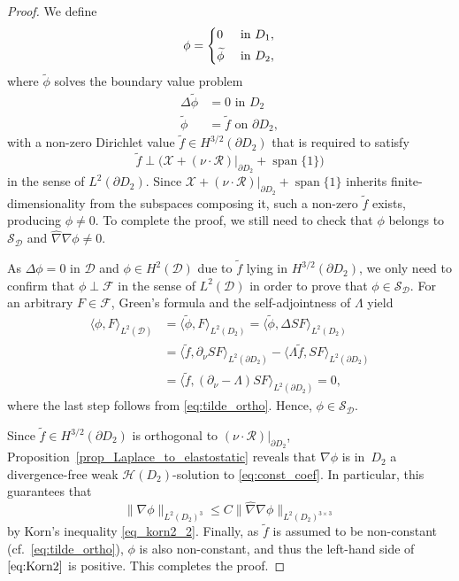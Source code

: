 \documentclass[reqno]{amsart}
\numberwithin{equation}{section}
\numberwithin{figure}{section}
\numberwithin{table}{section}
\newcommand{\norm}[1]{\lVert#1\rVert}
\newcommand{\inner}[1]{\langle#1\rangle}
\newcommand{\D}{\mathcal{D}}
\newcommand\Span{\operatorname{span}}
\theoremstyle{definition}
\theoremstyle{plain}
\theoremstyle{definition}
\theoremstyle{remark}
\numberwithin{equation}{section}
\begin{document}
\begin{proof}
	We define 
	\begin{equation*}
		\phi = 
		\begin{dcases}
		0 &\text{ in } D_1, \\
		\widetilde{\phi} &\text{ in } D_2,
		\end{dcases}
	\end{equation*}
	where $\widetilde{\phi}$ solves the boundary value problem
	\begin{align*}
		\Delta\widetilde{\phi} &= 0 \text{ in } D_2 \\
		\widetilde{\phi} &= \widetilde{f} \text{ on } \partial D_2,
	\end{align*}
	with a non-zero Dirichlet value $\widetilde{f} \in H^{3/2}(\partial D_2)$ that is required to satisfy
	\begin{equation} \label{eq:tilde_ortho}
		\widetilde f \perp \bigl(\mathcal{X} + (\nu \cdot \mathcal{R})|_{\partial D_2} + \Span\{1\} \bigr)
	\end{equation}
	in the sense of $L^2(\partial D_2)$. Since $\mathcal{X} + (\nu \cdot \mathcal R)|_{\partial D_2} + \Span\{1\}$ inherits finite-dimensionality from the subspaces composing it, such  a non-zero $\widetilde f$ exists, producing $\phi \neq 0$. To complete the proof, we still need to check that $\phi$ belongs to $\mathcal{S}_{\D}$ and $\widehat{\nabla} \nabla \phi \neq 0$.
	
	As $\Delta \phi = 0$ in $\D$ and $\phi \in H^2(\D)$ due to $\widetilde{f}$ lying in $H^{3/2}(\partial D_2)$, we only need to confirm that $\phi \perp \mathcal{F}$ in the sense of $L^2(\D)$ in order to prove  that  $\phi \in \mathcal{S}_{\D}$. For an arbitrary $F \in \mathcal F$, Green's formula and the self-adjointness of $\Lambda$ yield
	\begin{align*} 
		\inner{\phi, F}_{L^2(\D)} &= \inner{\widetilde{\phi}, F}_{L^2(D_2)} = \inner{\widetilde{\phi} , \Delta SF}_{L^2(D_2)}  \\
		&= \inner{\widetilde{f}, \partial_\nu SF}_{L^2(\partial D_2)}  -  \inner{\Lambda \widetilde{f}, SF}_{L^2(\partial D_2)} \\
		&= \inner{\widetilde{f}, (\partial_\nu - \Lambda)SF}_{L^2(\partial D_2)} = 0,  
	\end{align*}
	where the last step follows from \eqref{eq:tilde_ortho}. Hence, $\phi \in \mathcal{S}_{\D}$.
	
	Since $\widetilde{f} \in H^{3/2}(\partial D_2)$ is orthogonal to $(\nu \cdot \mathcal R)|_{\partial D_2}$, Proposition~\ref{prop_Laplace_to_elastostatic} reveals that $\nabla \phi$ is in~$D_2$ a divergence-free weak $\mathcal{H}(D_2)$-solution to \eqref{eq:const_coef}. In particular, this guarantees that 
	\begin{equation} \label{eq:Korn2}
		\norm{\nabla \phi}_{L^2(D_2)^3} \leq C \norm{\widehat{\nabla} \nabla \phi}_{L^2(D_2)^{3 \times 3}}
	\end{equation}
	by Korn's inequality \eqref{eq_korn2_2}. Finally, as $\widetilde{f}$ is assumed to be non-constant (cf.~\eqref{eq:tilde_ortho}), $\phi$ is also non-constant, and thus the left-hand side of $\eqref{eq:Korn2}$ is positive. This completes the proof.
\end{proof}
\end{document}
